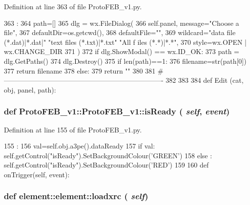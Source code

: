 Definition at line 363 of file ProtoFEB\_\-v1.py.


\begin{DoxyCode}
363                      :
364         path=[]
365         dlg = wx.FileDialog(
366             self.panel, message="Choose a file",
367             defaultDir=os.getcwd(),
368             defaultFile="",
369             wildcard="data file (*.dat)|*.dat|" "text files (*.txt)|*.txt" "All f
      iles (*.*)|*.*",
370             style=wx.OPEN | wx.CHANGE_DIR
371             )
372         if dlg.ShowModal() == wx.ID_OK:
373             path = dlg.GetPaths()
374         dlg.Destroy()
375         if len(path)==1:
376             filename=str(path[0])
377             return filename
378         else:
379             return ""
380 
381 #----------------------------------------------------------------------
382 
383 
384 
def Edit (cat, obj, panel, path):
\end{DoxyCode}
\hypertarget{classProtoFEB__v1_1_1ProtoFEB__v1_a031fbbb17ded0f3312a237b7c0d29305}{
\subsubsection[{isReady}]{\setlength{\rightskip}{0pt plus 5cm}def ProtoFEB\_\-v1::ProtoFEB\_\-v1::isReady ( {\em self}, \/   {\em event})}}
\label{classProtoFEB__v1_1_1ProtoFEB__v1_a031fbbb17ded0f3312a237b7c0d29305}


Definition at line 155 of file ProtoFEB\_\-v1.py.


\begin{DoxyCode}
155                             :
156         val=self.obj.a3pe().dataReady
157         if val: self.getControl("isReady").SetBackgroundColour('GREEN')
158         else : self.getControl("isReady").SetBackgroundColour('RED')
159 
160 
    def onTrigger(self, event):
\end{DoxyCode}
\hypertarget{classelement_1_1element_a917516054d0cd3a641c57be859dbe370}{
\subsubsection[{loadxrc}]{\setlength{\rightskip}{0pt plus 5cm}def element::element::loadxrc ( {\em self})}}
\label{classelement_1_1element_a917516054d0cd3a641c57be859dbe370}


